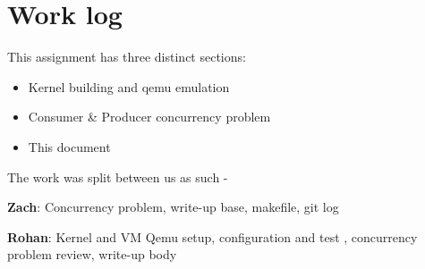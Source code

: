 \documentclass[letterpaper,10pt,fleqn]{article}
\begin{document}
	\section*{Work log}
	This assignment has three distinct sections:
	\begin{itemize}
		\item Kernel building and qemu emulation
		\item Consumer \& Producer concurrency problem
		\item This document
	\end{itemize}
	The work was split between us as such -

	\textbf{Zach}: Concurrency problem, write-up base, makefile, git log

	\textbf{Rohan}: Kernel and VM Qemu setup, configuration and test , concurrency problem review, write-up body
\end{document}
